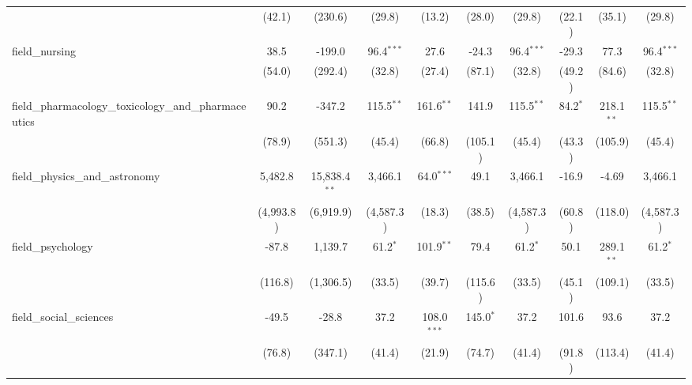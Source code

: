 \begin{tabular}{lccccccccc}
                                                               & (42.1)           & (230.6)         & (29.8)         & (13.2)        & (28.0)        & (29.8)         & (22.1)        & (35.1)        & (29.8)\\   
   field\_nursing                                              & 38.5             & -199.0          & 96.4$^{***}$   & 27.6          & -24.3         & 96.4$^{***}$   & -29.3         & 77.3          & 96.4$^{***}$\\   
                                                               & (54.0)           & (292.4)         & (32.8)         & (27.4)        & (87.1)        & (32.8)         & (49.2)        & (84.6)        & (32.8)\\   
   field\_pharmacology\_toxicology\_and\_pharmaceutics         & 90.2             & -347.2          & 115.5$^{**}$   & 161.6$^{**}$  & 141.9         & 115.5$^{**}$   & 84.2$^{*}$    & 218.1$^{**}$  & 115.5$^{**}$\\   
                                                               & (78.9)           & (551.3)         & (45.4)         & (66.8)        & (105.1)       & (45.4)         & (43.3)        & (105.9)       & (45.4)\\   
   field\_physics\_and\_astronomy                              & 5,482.8          & 15,838.4$^{**}$ & 3,466.1        & 64.0$^{***}$  & 49.1          & 3,466.1        & -16.9         & -4.69         & 3,466.1\\   
                                                               & (4,993.8)        & (6,919.9)       & (4,587.3)      & (18.3)        & (38.5)        & (4,587.3)      & (60.8)        & (118.0)       & (4,587.3)\\   
   field\_psychology                                           & -87.8            & 1,139.7         & 61.2$^{*}$     & 101.9$^{**}$  & 79.4          & 61.2$^{*}$     & 50.1          & 289.1$^{**}$  & 61.2$^{*}$\\   
                                                               & (116.8)          & (1,306.5)       & (33.5)         & (39.7)        & (115.6)       & (33.5)         & (45.1)        & (109.1)       & (33.5)\\   
   field\_social\_sciences                                     & -49.5            & -28.8           & 37.2           & 108.0$^{***}$ & 145.0$^{*}$   & 37.2           & 101.6         & 93.6          & 37.2\\   
                                                               & (76.8)           & (347.1)         & (41.4)         & (21.9)        & (74.7)        & (41.4)         & (91.8)        & (113.4)       & (41.4)\\   

\end{tabular}
